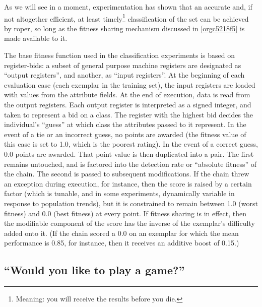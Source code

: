 \documentclass[12pt,glossary]{dalthesis}
\begin{document}
As we will see in a moment, experimentation has shown that an accurate and, if not
altogether efficient, at least timely\footnote{Meaning: you will receive the results before you die.} classification of the set can be achieved by
\gls{roper}, so long as the fitness sharing mechanism discussed in \ref{orgc5218f5}
is made available to it. 

The base fitness function used in the classification experiments is based on
register-bids: a subset of general purpose machine registers are designated
as ``output registers'', and another, as ``input registers''. At the beginning of
each evaluation case (each exemplar in the training set), the input registers
are loaded with values from the attribute fields. At the end of execution,
data is read from the output registers. Each output register is interpreted
as a signed integer, and taken to represent a bid on a class. The register
with the highest bid decides the individual's ``guess'' at which class the
attributes passed to it represent. In the event of a tie or an incorrect
guess, no points are awarded (the fitness value of this case is set to 1.0,
which is the poorest rating). In the event of a correct guess, 0.0 points
are awarded. That point value is then duplicated into a pair. The first
remains untouched, and is factored into the detection rate or ``absolute
fitness'' of the chain. The second is passed to subsequent modifications.
If the chain threw an exception during execution, for instance, then the
score is raised by a certain factor (which is tunable, and in some experiments,
dynamically variable in response to population trends), but it is constrained
to remain between 1.0 (worst fitness) and 0.0 (best fitness) at every point.
If fitness sharing is in effect, then the modifiable component of the score
has the inverse of the exemplar's difficulty added onto it. (If the chain
scored a 0.0 on an exemplar for which the mean performance is 0.85, for instance,
then it receives an additive boost of 0.15.)



\subsection{``Would you like to play a game?''}
\label{sec:org9c9e371}
\label{orga9eb965}
\end{document}
